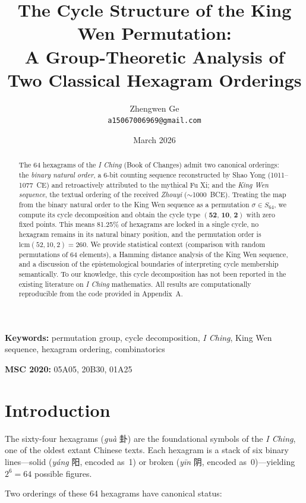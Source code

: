 \documentclass[11pt,a4paper]{article}
\title{%
  The Cycle Structure of the King Wen Permutation:\\
  A Group-Theoretic Analysis of Two Classical Hexagram Orderings%
}
\author{
  Zhengwen Ge\\
  \texttt{a15067006969@gmail.com}
}
\date{March 2026}
\begin{document}
\maketitle

\begin{abstract}
The 64 hexagrams of the \textit{I Ching} (Book of Changes) admit two canonical orderings: the \emph{binary natural order}, a 6-bit counting sequence reconstructed by Shao Yong (1011--1077~CE) and retroactively attributed to the mythical Fu Xi; and the \emph{King Wen sequence}, the textual ordering of the received \textit{Zhouyi} ($\sim$1000~BCE).
Treating the map from the binary natural order to the King Wen sequence as a permutation $\sigma \in S_{64}$, we compute its cycle decomposition and obtain the cycle type $\mathbf{(52,\,10,\,2)}$ with zero fixed points.
This means 81.25\% of hexagrams are locked in a single cycle, no hexagram remains in its natural binary position, and the permutation order is $\mathrm{lcm}(52,10,2) = 260$.
We provide statistical context (comparison with random permutations of 64 elements), a Hamming distance analysis of the King Wen sequence, and a discussion of the epistemological boundaries of interpreting cycle membership semantically.
To our knowledge, this cycle decomposition has not been reported in the existing literature on \textit{I Ching} mathematics.
All results are computationally reproducible from the code provided in Appendix~A.
\end{abstract}

\bigskip
\noindent\textbf{Keywords:} permutation group, cycle decomposition, \textit{I Ching}, King Wen sequence, hexagram ordering, combinatorics

\noindent\textbf{MSC 2020:} 05A05, 20B30, 01A25


\section{Introduction}\label{sec:intro}

The sixty-four hexagrams (\textit{guà} 卦) are the foundational symbols of the \textit{I Ching}, one of the oldest extant Chinese texts.
Each hexagram is a stack of six binary lines---solid (\textit{yáng} 阳, encoded as~1) or broken (\textit{yīn} 阴, encoded as~0)---yielding $2^6 = 64$ possible figures.

Two orderings of these 64 hexagrams have canonical status:
\end{document}
